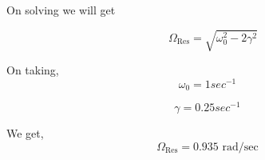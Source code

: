 \documentclass[11pt]{article}
\begin{document}
On solving we will get

\begin{equation}
    \quad \Omega_{\text{Res}} = \sqrt{\omega_0^2 - 2\gamma^2} \tag{14}
\end{equation}

On taking,
\begin{equation}
    \omega_0 = 1 {sec^{-1}} \tag{15}
\end{equation}

\begin{equation}
    \gamma = 0.25 {sec^{-1}} \tag{16}
\end{equation}

We get,
\begin{equation}
    \Omega_{\text{Res}} = 0.935 \text{ rad/sec} \tag{17}
\end{equation}
\end{document}
